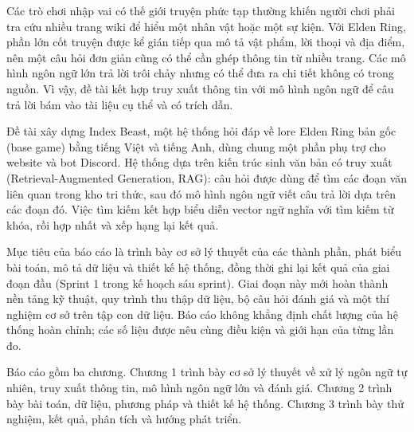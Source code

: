 
Các trò chơi nhập vai có thế giới truyện phức tạp thường khiến người chơi phải tra cứu nhiều trang wiki để hiểu một nhân vật hoặc một sự kiện. Với Elden Ring, phần lớn cốt truyện được kể gián tiếp qua mô tả vật phẩm, lời thoại và địa điểm, nên một câu hỏi đơn giản cũng có thể cần ghép thông tin từ nhiều trang. Các mô hình ngôn ngữ lớn trả lời trôi chảy nhưng có thể đưa ra chi tiết không có trong nguồn. Vì vậy, đề tài kết hợp truy xuất thông tin với mô hình ngôn ngữ để câu trả lời bám vào tài liệu cụ thể và có trích dẫn.


Đề tài xây dựng Index Beast, một hệ thống hỏi đáp về lore Elden Ring bản gốc (base game) bằng tiếng Việt và tiếng Anh, dùng chung một phần phụ trợ cho website và bot Discord. Hệ thống dựa trên kiến trúc sinh văn bản có truy xuất (Retrieval-Augmented Generation, RAG): câu hỏi được dùng để tìm các đoạn văn liên quan trong kho tri thức, sau đó mô hình ngôn ngữ viết câu trả lời dựa trên các đoạn đó. Việc tìm kiếm kết hợp biểu diễn vector ngữ nghĩa với tìm kiếm từ khóa, rồi hợp nhất và xếp hạng lại kết quả.


Mục tiêu của báo cáo là trình bày cơ sở lý thuyết của các thành phần, phát biểu bài toán, mô tả dữ liệu và thiết kế hệ thống, đồng thời ghi lại kết quả của giai đoạn đầu (Sprint 1 trong kế hoạch sáu sprint). Giai đoạn này mới hoàn thành nền tảng kỹ thuật, quy trình thu thập dữ liệu, bộ câu hỏi đánh giá và một thí nghiệm cơ sở trên tập con dữ liệu. Báo cáo không khẳng định chất lượng của hệ thống hoàn chỉnh; các số liệu được nêu cùng điều kiện và giới hạn của từng lần đo.


Báo cáo gồm ba chương. Chương 1 trình bày cơ sở lý thuyết về xử lý ngôn ngữ tự nhiên, truy xuất thông tin, mô hình ngôn ngữ lớn và đánh giá. Chương 2 trình bày bài toán, dữ liệu, phương pháp và thiết kế hệ thống. Chương 3 trình bày thử nghiệm, kết quả, phân tích và hướng phát triển.
